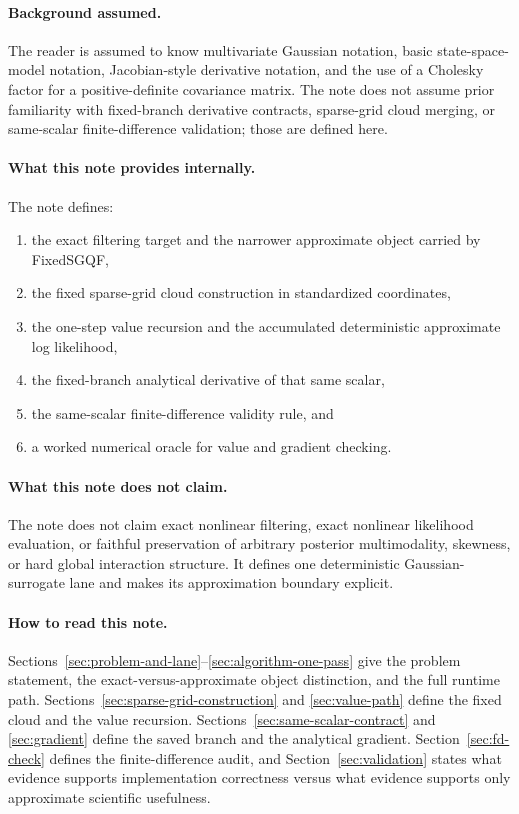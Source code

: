 \documentclass[11pt]{article}
\numberwithin{equation}{section}
\begin{document}
\paragraph{Background assumed.}
The reader is assumed to know multivariate Gaussian notation, basic
state-space-model notation, Jacobian-style derivative notation, and the use of a
Cholesky factor for a positive-definite covariance matrix.  The note does not
assume prior familiarity with fixed-branch derivative contracts, sparse-grid
cloud merging, or same-scalar finite-difference validation; those are defined
here.

\paragraph{What this note provides internally.}
The note defines:
\begin{enumerate}[leftmargin=0.3in]
  \item the exact filtering target and the narrower approximate object carried by
  FixedSGQF,
  \item the fixed sparse-grid cloud construction in standardized coordinates,
  \item the one-step value recursion and the accumulated deterministic
  approximate log likelihood,
  \item the fixed-branch analytical derivative of that same scalar,
  \item the same-scalar finite-difference validity rule, and
  \item a worked numerical oracle for value and gradient checking.
\end{enumerate}

\paragraph{What this note does not claim.}
The note does not claim exact nonlinear filtering, exact nonlinear likelihood
evaluation, or faithful preservation of arbitrary posterior multimodality,
skewness, or hard global interaction structure.  It defines one deterministic
Gaussian-surrogate lane and makes its approximation boundary explicit.

\paragraph{How to read this note.}
Sections~\ref{sec:problem-and-lane}--\ref{sec:algorithm-one-pass} give the
problem statement, the exact-versus-approximate object distinction, and the full
runtime path.  Sections~\ref{sec:sparse-grid-construction} and
\ref{sec:value-path} define the fixed cloud and the value recursion.
Sections~\ref{sec:same-scalar-contract} and \ref{sec:gradient} define the saved
branch and the analytical gradient.  Section~\ref{sec:fd-check} defines the
finite-difference audit, and Section~\ref{sec:validation} states what evidence
supports implementation correctness versus what evidence supports only
approximate scientific usefulness.
\end{document}

